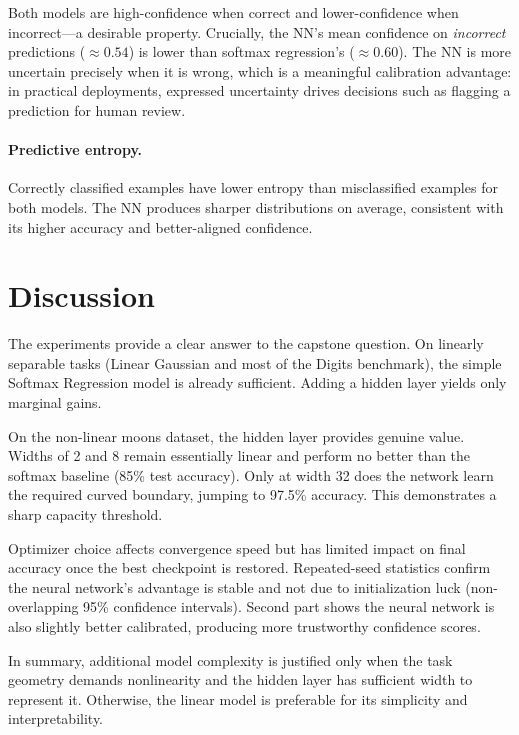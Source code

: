 \documentclass[11pt]{article}
\begin{document}
Both models are high-confidence when correct and lower-confidence when
incorrect---a desirable property.
Crucially, the NN's mean confidence on \emph{incorrect} predictions
($\approx0.54$) is lower than softmax regression's ($\approx0.60$).
The NN is more uncertain precisely when it is wrong, which is a meaningful
calibration advantage: in practical deployments, expressed uncertainty drives
decisions such as flagging a prediction for human review.

\paragraph{Predictive entropy.}
Correctly classified examples have lower entropy than misclassified examples
for both models.
The NN produces sharper distributions on average, consistent with its higher
accuracy and better-aligned confidence.


\section{Discussion}
\label{sec:discussion}

The experiments provide a clear answer to the capstone question. On linearly separable tasks (Linear Gaussian and most of the Digits benchmark), the simple Softmax Regression model is already sufficient. Adding a hidden layer yields only marginal gains.

On the non-linear moons dataset, the hidden layer provides genuine value. Widths of 2 and 8 remain essentially linear and perform no better than the softmax baseline (85\% test accuracy). Only at width 32 does the network learn the required curved boundary, jumping to 97.5\% accuracy. This demonstrates a sharp capacity threshold.

Optimizer choice affects convergence speed but has limited impact on final accuracy once the best checkpoint is restored. Repeated-seed statistics confirm the neural network’s advantage is stable and not due to initialization luck (non-overlapping 95\% confidence intervals). Second part shows the neural network is also slightly better calibrated, producing more trustworthy confidence scores.

In summary, additional model complexity is justified only when the task geometry demands nonlinearity and the hidden layer has sufficient width to represent it. Otherwise, the linear model is preferable for its simplicity and interpretability.
\end{document}
